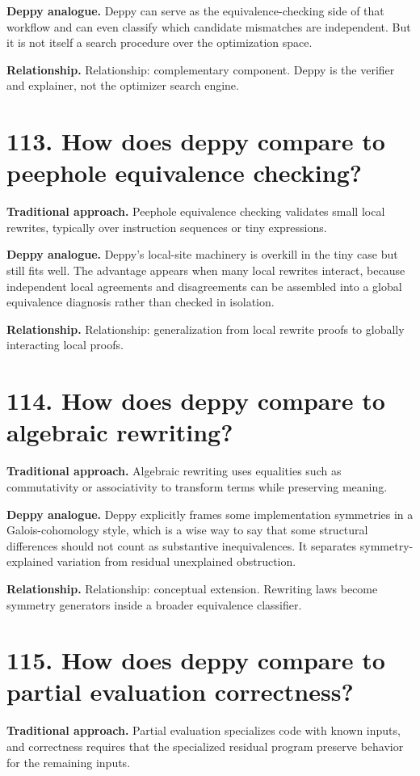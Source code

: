 \documentclass[11pt,openany]{book}
\begin{document}
\textbf{Deppy analogue.} Deppy can serve as the equivalence-checking side of that workflow and can even classify which candidate mismatches are independent. But it is not itself a search procedure over the optimization space.

\textbf{Relationship.} Relationship: complementary component. Deppy is the verifier and explainer, not the optimizer search engine.

\section*{113. How does deppy compare to peephole equivalence checking?}
\textbf{Traditional approach.} Peephole equivalence checking validates small local rewrites, typically over instruction sequences or tiny expressions.

\textbf{Deppy analogue.} Deppy's local-site machinery is overkill in the tiny case but still fits well. The advantage appears when many local rewrites interact, because independent local agreements and disagreements can be assembled into a global equivalence diagnosis rather than checked in isolation.

\textbf{Relationship.} Relationship: generalization from local rewrite proofs to globally interacting local proofs.

\section*{114. How does deppy compare to algebraic rewriting?}
\textbf{Traditional approach.} Algebraic rewriting uses equalities such as commutativity or associativity to transform terms while preserving meaning.

\textbf{Deppy analogue.} Deppy explicitly frames some implementation symmetries in a Galois-cohomology style, which is a wise way to say that some structural differences should not count as substantive inequivalences. It separates symmetry-explained variation from residual unexplained obstruction.

\textbf{Relationship.} Relationship: conceptual extension. Rewriting laws become symmetry generators inside a broader equivalence classifier.

\section*{115. How does deppy compare to partial evaluation correctness?}
\textbf{Traditional approach.} Partial evaluation specializes code with known inputs, and correctness requires that the specialized residual program preserve behavior for the remaining inputs.
\end{document}
